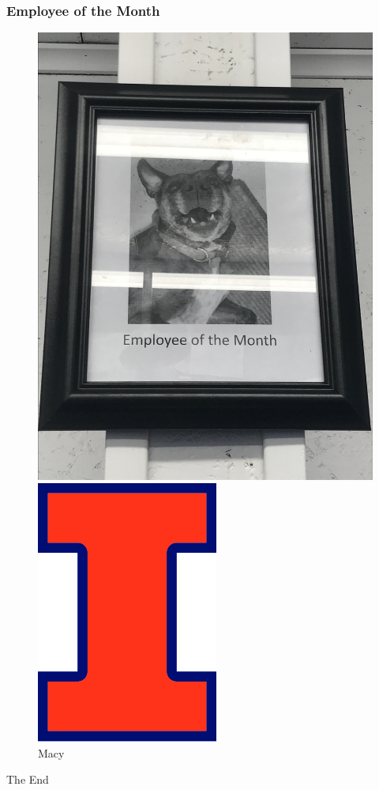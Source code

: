 \documentclass[12pt]{beamer}\usepackage[]{graphicx}\usepackage[]{color}
\begin{document}
\begin{frame}
\frametitle{Employee of the Month}
    \centering
    \begin{figure}
    \begin{minipage}{0.45\textwidth}
      \centering
      \includegraphics[width=0.5\linewidth]{
   Month.jpg} %
        \caption{Macy}
    \end{minipage}\hfill
    \begin{minipage}{0.45\textwidth}
      \centering
      \includegraphics[width=0.5\linewidth]{
   BlockI-Logo-Full-Color-CMYK.jpg} %
    \end{minipage}
    \end{figure}
\end{frame}

\begin{frame}
\Huge{\centerline{The End}}
\end{frame}

\end{document}
